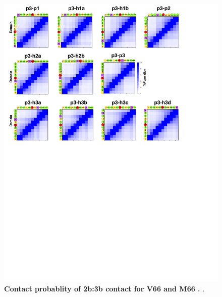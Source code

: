 \documentclass[journal=jacsat,manuscript=article]{achemso}
\begin{document}
\begin{figure}[!ht]
 \includegraphics[scale=0.5,width=\textwidth,trim={0 0cm 0 0},clip]{../figures/S4.pdf}
\caption{{\bf Contact probablity of 2b:3b contact for V66 and M66 .}
.
 }
\label{S4} 
\end{figure}
\end{document}
